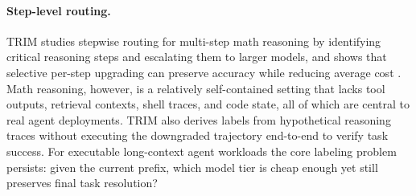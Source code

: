 \paragraph{Step-level routing.}
TRIM studies stepwise routing for multi-step math reasoning by identifying
critical reasoning steps and escalating them to larger models, and shows
that selective per-step upgrading can preserve accuracy while reducing
average cost \citep{kapoor2026trim}. Math reasoning, however, is a
relatively self-contained setting that lacks tool outputs, retrieval
contexts, shell traces, and code state, all of which are central to real
agent deployments. TRIM also derives labels from hypothetical reasoning
traces without executing the downgraded trajectory end-to-end to verify
task success. For executable long-context agent workloads the core
labeling problem persists: given the current prefix, which model tier is
cheap enough yet still preserves final task resolution?
